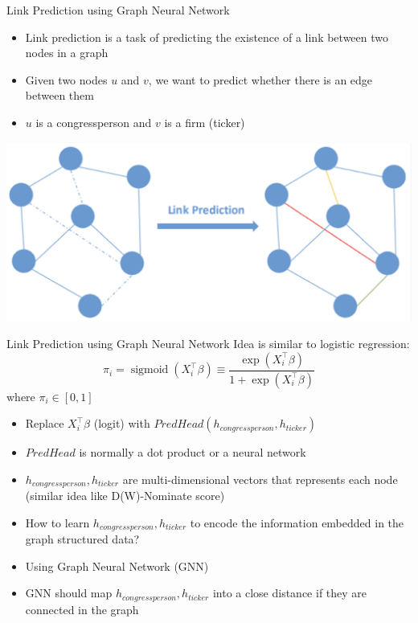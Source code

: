 \documentclass{beamer}
\begin{document}
	\begin{frame}{Link Prediction using Graph Neural Network}
		\begin{itemize}
			\item Link prediction is a task of predicting the existence of a link between two nodes in a graph
			\item Given two nodes $u$ and $v$, we want to predict whether there is an edge between them
			\item $u$ is a congressperson and $v$ is a firm (ticker)
		\end{itemize}
\centering	\includegraphics[scale=0.4]{./images/linkpred.png}
	\end{frame}	

	\begin{frame}{Link Prediction using Graph Neural Network}
		Idea is similar to logistic regression:
		$$
\pi_i=\operatorname{sigmoid}\left(X_i^{\top} \beta\right) \equiv \frac{\exp \left(X_i^{\top} \beta\right)}{1+\exp \left(X_i^{\top} \beta\right)}
$$
where $\pi_i \in [0, 1]$
		\begin{itemize}
			\item Replace $X_i^{\top} \beta$ (logit) with $PredHead(h_{congressperson}, h_{ticker})$
			\item $PredHead$ is normally a dot product or a neural network
			\item $h_{congressperson}, h_{ticker}$ are multi-dimensional vectors that represents each node (similar idea like D(W)-Nominate score)
			\item How to learn $h_{congressperson}, h_{ticker}$ to encode the information embedded in the graph structured data? 
			\item Using Graph Neural Network (GNN)
			\item GNN should map $h_{congressperson}, h_{ticker}$ into a close distance if they are connected in the graph
		\end{itemize}

	\end{frame}	
\end{document}
